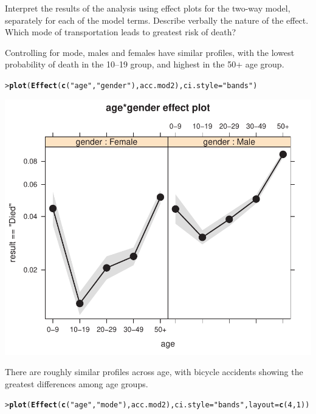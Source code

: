 \documentclass[10pt]{report}\usepackage[]{graphicx}\usepackage[]{color}
\makeatletter
\newcommand{\hlnum}[1]{\textcolor[rgb]{0.686,0.059,0.569}{#1}}%
\newcommand{\hlstr}[1]{\textcolor[rgb]{0.192,0.494,0.8}{#1}}%
\newcommand{\hlstd}[1]{\textcolor[rgb]{0.345,0.345,0.345}{#1}}%
\newcommand{\hlkwc}[1]{\textcolor[rgb]{0.333,0.667,0.333}{#1}}%
\newcommand{\hlkwd}[1]{\textcolor[rgb]{0.737,0.353,0.396}{\textbf{#1}}}%
\newenvironment{kframe}{%
 \def\at@end@of@kframe{}%
 \ifinner\ifhmode%
  \def\at@end@of@kframe{\end{minipage}}%
  \begin{minipage}{\columnwidth}%
 \fi\fi%
 \def\FrameCommand##1{\hskip\@totalleftmargin \hskip-\fboxsep
 \colorbox{shadecolor}{##1}\hskip-\fboxsep
     \hskip-\linewidth \hskip-\@totalleftmargin \hskip\columnwidth}%
 \MakeFramed {\advance\hsize-\width
   \@totalleftmargin\z@ \linewidth\hsize
   \@setminipage}}%
 {\par\unskip\endMakeFramed%
 \at@end@of@kframe}
\newenvironment{knitrout}{}{} %
\renewenvironment{knitrout}{\small\renewcommand{\baselinestretch}{.85}}{} %
\makeatother
\begin{document}
\begin{Exercises}
\begin{enumerate*}
\begin{ans}
    \end{ans}
    
    \item Interpret the results of the analysis using effect plots for the two-way model, separately for each of
    the model terms. Describe verbally the nature of the  effect. 
    Which mode of transportation leads to greatest risk of death?
    \begin{ans}
    Controlling for mode, males and females have similar profiles, with the lowest probability
    of death in the 10--19 group, and highest in the 50+ age group.
\begin{knitrout}\footnotesize
{}\color{fgcolor}\begin{kframe}
\begin{alltt}
\hlstd{> }\hlkwd{plot}\hlstd{(}\hlkwd{Effect}\hlstd{(}\hlkwd{c}\hlstd{(}\hlstr{"age"}\hlstd{,} \hlstr{"gender"}\hlstd{), acc.mod2),} \hlkwc{ci.style}\hlstd{=}\hlstr{"bands"}\hlstd{)}
\end{alltt}
\end{kframe}

\centerline{\includegraphics[width=.5\textwidth]{soln/fig/ex7_7d1-1} }



\end{knitrout}
    There are roughly similar profiles across age, with bicycle accidents showing the greatest differences
    among age groups.
\begin{knitrout}\footnotesize
{}\color{fgcolor}\begin{kframe}
\begin{alltt}
\hlstd{> }\hlkwd{plot}\hlstd{(}\hlkwd{Effect}\hlstd{(}\hlkwd{c}\hlstd{(}\hlstr{"age"}\hlstd{,} \hlstr{"mode"}\hlstd{), acc.mod2),} \hlkwc{ci.style}\hlstd{=}\hlstr{"bands"}\hlstd{,} \hlkwc{layout}\hlstd{=}\hlkwd{c}\hlstd{(}\hlnum{4}\hlstd{,}\hlnum{1}\hlstd{))}
\end{alltt}
\end{kframe}


\end{knitrout}
\end{ans}
\end{enumerate*}
\end{Exercises}
\end{document}
